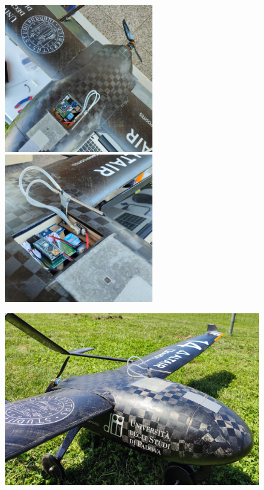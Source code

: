 \documentclass[12pt]{article}
\begin{document}
\begin{figure}[!h]
	\centering
	\includegraphics[width=6.5cm]{img/ph-radar}
	\,
	\includegraphics[width=6.5cm]{img/ph-radar-near}
	\captionsetup{labelformat=empty}
\end{figure}

\begin{figure}[!h]
	\centering
	\includegraphics[width=13.35cm]{img/ph-radar-closed}
	\captionsetup{labelformat=empty}
\end{figure}
\end{document}
